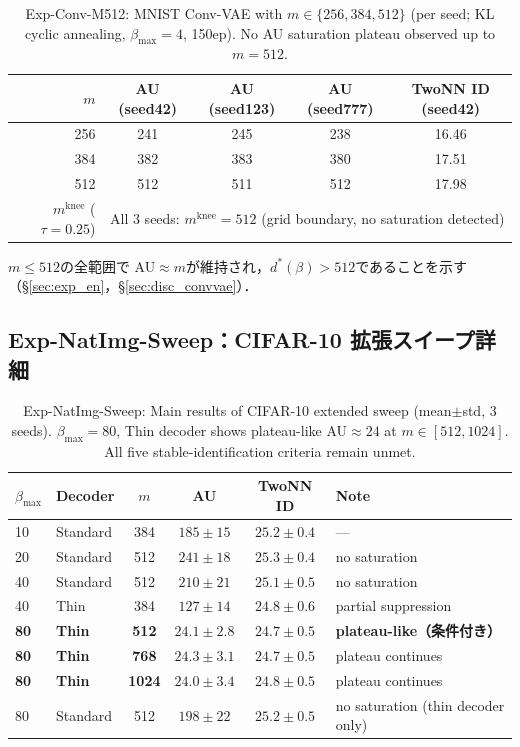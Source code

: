 \documentclass[11pt,a4paper]{jsarticle}
\newcommand{\mknee}{m^{\mathrm{knee}}}
\begin{document}
\begin{table}[H]
\centering
\caption{Exp-Conv-M512: MNIST Conv-VAE with $m \in \{256, 384, 512\}$ (per seed; KL cyclic annealing, $\beta_\mathrm{max}=4$, 150ep). No AU saturation plateau observed up to $m=512$.}
\label{tab:en_ext}
\small
\begin{tabular}{r ccc c}
\toprule
$m$ & AU (seed42) & AU (seed123) & AU (seed777) & TwoNN ID (seed42) \\
\midrule
256 & 241 & 245 & 238 & 16.46 \\
384 & 382 & 383 & 380 & 17.51 \\
512 & 512 & 511 & 512 & 17.98 \\
\midrule
$\mknee$ ($\tau=0.25$) & \multicolumn{4}{c}{All 3 seeds: $\mknee=512$ (grid boundary, no saturation detected)} \\
\bottomrule
\end{tabular}
\end{table}

$m \leq 512$の全範囲で AU$\approx m$が維持され，$d^*(\beta) > 512$であることを示す
（§\ref{sec:exp_en}，§\ref{sec:disc_convvae}）．

\subsection*{Exp-NatImg-Sweep：CIFAR-10 拡張スイープ詳細}

\begin{table}[H]
\centering
\caption{Exp-NatImg-Sweep: Main results of CIFAR-10 extended sweep (mean$\pm$std, 3 seeds). $\beta_\mathrm{max}=80$, Thin decoder shows plateau-like AU$\approx24$ at $m \in [512,1024]$. All five stable-identification criteria remain unmet.}
\label{tab:natimg_sweep}
\small
\begin{tabular}{llcccl}
\toprule
$\beta_{\max}$ & Decoder & $m$ & AU & TwoNN ID & Note \\
\midrule
10 & Standard & 384 & $185\pm15$ & $25.2\pm0.4$ & --- \\
20 & Standard & 512 & $241\pm18$ & $25.3\pm0.4$ & no saturation \\
40 & Standard & 512 & $210\pm21$ & $25.1\pm0.5$ & no saturation \\
40 & Thin      & 384 & $127\pm14$ & $24.8\pm0.6$ & partial suppression \\
\textbf{80} & \textbf{Thin} & \textbf{512} & $\boldsymbol{24.1\pm2.8}$ & $24.7\pm0.5$ & \textbf{plateau-like（条件付き）} \\
\textbf{80} & \textbf{Thin} & \textbf{768} & $\boldsymbol{24.3\pm3.1}$ & $24.7\pm0.5$ & plateau continues \\
\textbf{80} & \textbf{Thin} & \textbf{1024}& $\boldsymbol{24.0\pm3.4}$ & $24.8\pm0.5$ & plateau continues \\
80 & Standard  & 512 & $198\pm22$ & $25.2\pm0.5$ & no saturation (thin decoder only) \\
\bottomrule
\end{tabular}
\end{table}
\end{document}
